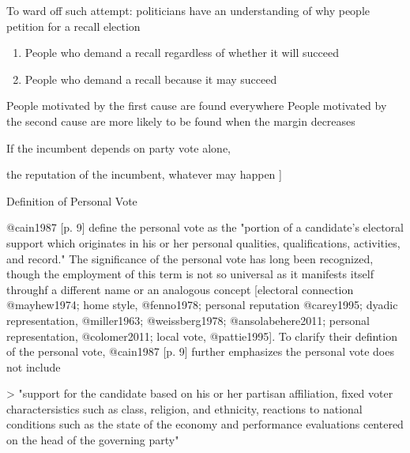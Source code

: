 \documentclass[hyphens, crop=false]{standalone}
\begin{document}
		To ward off such attempt:
		politicians have an understanding of why people petition for a recall election
		\begin{enumerate}
			\item 
			People who demand a recall regardless of whether it will succeed
			\item 
			People who demand a recall because it may succeed
		\end{enumerate}
		People motivated by the first cause are found everywhere
		People motivated by the second cause are more likely to be found when the margin decreases
		
		If the incumbent depends on party vote alone, 
		
		the reputation of the incumbent,
		whatever may happen
		]	

	
		Definition of Personal Vote
	
		@cain1987 [p. 9] define the personal vote as the "portion of a candidate's electoral support which originates in his or her
		personal qualities,
		qualifications,
		activities,
		and record."
		The significance of the personal vote has long been recognized,
		though the employment of this term is not so universal as it manifests itself throughf a different name or an analogous concept [electoral connection @mayhew1974; home style,
		 @fenno1978; personal reputation @carey1995; dyadic representation,
		 @miller1963; @weissberg1978; @ansolabehere2011; personal representation,
		 @colomer2011; local vote,
		 @pattie1995].
		 To clarify their defintion of the personal vote,
		 @cain1987 [p.
		 9] further emphasizes the personal vote does not include
	
	> "support for the candidate based on his or her partisan affiliation, fixed voter charactersistics such as class, religion, and ethnicity, reactions to national conditions such as the state of the economy and performance evaluations centered on the head of the governing party"
	
\end{document}
